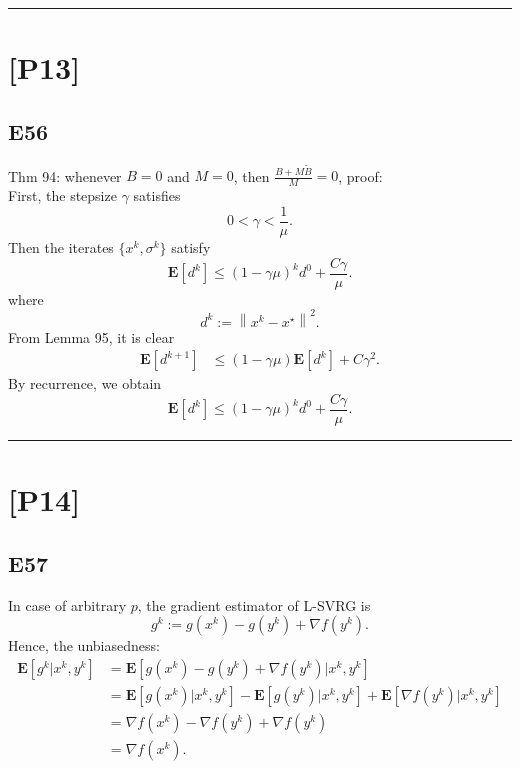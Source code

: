 \documentclass[12pt]{article}
\begin{document}
\hrule
\vspace{0.1cm}
\section*{[P13]}
\subsection*{E56}
Thm 94: whenever $B=0$ and $M=0$, then $\frac{B+M\tilde{B}}{M} = 0$, proof:\\
First, the stepsize $\gamma$ satisfies
\begin{equation}
    0 < \gamma < \frac{1}{\mu}.
    \label{eq:94gamma}
\end{equation}
Then the iterates $\{x^k, \sigma^k\}$ satisfy
\begin{equation}
    \mathbf{E}[d^k] \leq (1-\gamma\mu)^k d^0 + \frac{C\gamma}{\mu}.
    \label{eq:94iterate}
\end{equation}
where
\begin{equation}
    d^k := \left\| x^k - x^\star \right\|^2.
\end{equation}
From Lemma 95, it is clear
\begin{equation*}
    \begin{split}
        \mathbf{E}[d^{k+1}] &\leq (1-\gamma\mu)\mathbf{E}[d^k] + C\gamma^2.
    \end{split}
\end{equation*}
By recurrence, we obtain
\begin{equation*}
    \mathbf{E}[d^{k}] \leq (1-\gamma\mu)^k d^0 + \frac{C\gamma}{\mu}.
\end{equation*}

\hrule
\vspace{0.1cm}
\section*{[P14]}
\subsection*{E57}
In case of arbitrary $p$, the gradient estimator of L-SVRG is
\begin{equation*}
    g^k := g(x^k) - g(y^k) + \nabla f(y^k).
\end{equation*}
Hence, the unbiasedness:
\begin{equation*}
    \begin{split}
        \mathbf{E}[g^k|x^k, y^k] &= \mathbf{E}[g(x^k) - g(y^k) + \nabla f(y^k)|x^k, y^k] \\
        &= \mathbf{E}[g(x^k)|x^k, y^k] - \mathbf{E}[g(y^k)|x^k, y^k] + \mathbf{E}[\nabla f(y^k)|x^k, y^k] \\
        &= \nabla f(x^k) - \nabla f(y^k) + \nabla f(y^k)\\
        &= \nabla f(x^k).
    \end{split}
\end{equation*}
\end{document}
